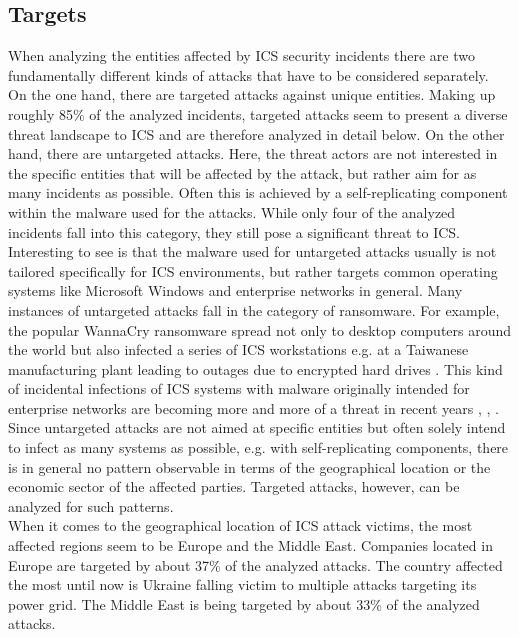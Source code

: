 \documentclass[runningheads]{llncs}
\begin{document}
\subsection{Targets}
\label{subsection:overview-targets}
When analyzing the entities affected by ICS security incidents there are two fundamentally different kinds of attacks that have to be considered separately.
On the one hand, there are targeted attacks against unique entities.
Making up roughly 85\% of the analyzed incidents, targeted attacks seem to present a diverse threat landscape to ICS and are therefore analyzed in detail below.
On the other hand, there are untargeted attacks.
Here, the threat actors are not interested in the specific entities that will be affected by the attack, but rather aim for as many incidents as possible.
Often this is achieved by a self-replicating component within the malware used for the attacks.
While only four of the analyzed incidents fall into this category, they still pose a significant threat to ICS.
Interesting to see is that the malware used for untargeted attacks usually is not tailored specifically for ICS environments, but rather targets common operating systems like Microsoft Windows and enterprise networks in general.
Many instances of untargeted attacks fall in the category of ransomware.
For example, the popular WannaCry ransomware spread not only to desktop computers around the world but also infected a series of ICS workstations e.g. at a Taiwanese manufacturing plant leading to outages due to encrypted hard drives \cite{skybox.18}.
This kind of incidental infections of ICS systems with malware originally intended for enterprise networks are becoming more and more of a threat in recent years \cite{dragos.19}, \cite{cyberx.19}, \cite{zimba.18}.\\
Since untargeted attacks are not aimed at specific entities but often solely intend to infect as many systems as possible, e.g. with self-replicating components, there is in general no pattern observable in terms of the geographical location or the economic sector of the affected parties.
Targeted attacks, however, can be analyzed for such patterns.\\
When it comes to the geographical location of ICS attack victims, the most affected regions seem to be Europe and the Middle East.
Companies located in Europe are targeted by about 37\% of the analyzed attacks.
The country affected the most until now is Ukraine falling victim to multiple attacks targeting its power grid.
The Middle East is being targeted by about 33\% of the analyzed attacks.
\end{document}
